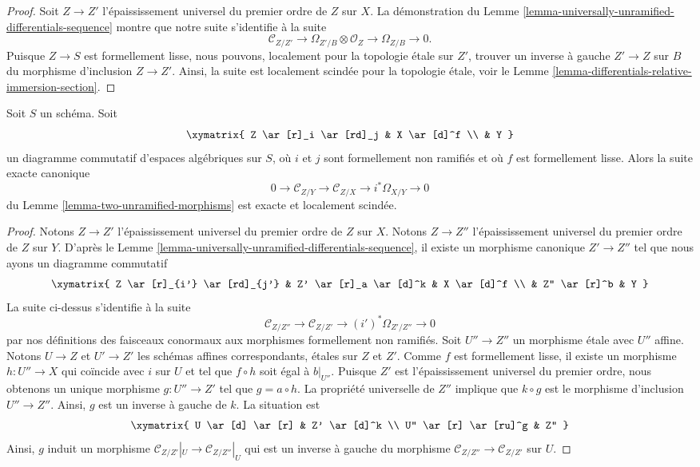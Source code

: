\begin{proof}
Soit $Z \to Z'$ l'épaississement universel du premier ordre de $Z$ sur $X$.
La démonstration du
Lemme \ref{lemma-universally-unramified-differentials-sequence}
montre que notre suite s'identifie à la suite
$$
\mathcal{C}_{Z/Z'} \to \Omega_{Z'/B} \otimes \mathcal{O}_Z \to
\Omega_{Z/B} \to 0.
$$
Puisque $Z \to S$ est formellement lisse, nous pouvons, localement pour la topologie étale sur $Z'$, trouver
un inverse à gauche $Z' \to Z$ sur $B$ du morphisme d'inclusion $Z \to Z'$.
Ainsi, la suite est localement scindée pour la topologie étale, voir le
Lemme \ref{lemma-differentials-relative-immersion-section}.
\end{proof}

\begin{lemma}
\label{lemma-two-unramified-morphisms-formally-smooth}
Soit $S$ un schéma. Soit
$$
\xymatrix{
Z \ar[r]_i \ar[rd]_j & X \ar[d]^f \\
& Y
}
$$
un diagramme commutatif d'espaces algébriques sur $S$,
où $i$ et $j$ sont formellement non ramifiés et où $f$ est formellement lisse.
Alors la suite exacte canonique
$$
0 \to
\mathcal{C}_{Z/Y} \to
\mathcal{C}_{Z/X} \to
i^*\Omega_{X/Y} \to 0
$$
du
Lemme \ref{lemma-two-unramified-morphisms}
est exacte et localement scindée.
\end{lemma}

\begin{proof}
Notons $Z \to Z'$ l'épaississement universel du premier ordre de $Z$ sur $X$.
Notons $Z \to Z''$ l'épaississement universel du premier ordre de $Z$ sur $Y$.
D'après le
Lemme \ref{lemma-universally-unramified-differentials-sequence},
il existe un morphisme canonique $Z' \to Z''$ tel que nous ayons un diagramme
commutatif
$$
\xymatrix{
Z \ar[r]_{i'} \ar[rd]_{j'} & Z' \ar[r]_a \ar[d]^k & X \ar[d]^f \\
& Z'' \ar[r]^b & Y
}
$$
La suite ci-dessus s'identifie à la suite
$$
\mathcal{C}_{Z/Z''} \to
\mathcal{C}_{Z/Z'} \to
(i')^*\Omega_{Z'/Z''} \to 0
$$
par nos définitions des faisceaux conormaux aux morphismes formellement non ramifiés.
Soit $U'' \to Z''$ un morphisme étale avec $U''$ affine.
Notons $U \to Z$ et $U' \to Z'$ les schémas affines correspondants,
étales sur $Z$ et $Z'$.
Comme $f$ est formellement lisse, il existe un morphisme $h : U'' \to X$
qui coïncide avec $i$ sur $U$ et tel que $f \circ h$ soit égal à $b|_{U''}$.
Puisque $Z'$ est l'épaississement universel du premier ordre, nous obtenons un unique
morphisme $g : U'' \to Z'$ tel que $g = a \circ h$. La propriété
universelle de $Z''$ implique que $k \circ g$ est le morphisme d'inclusion
$U'' \to Z''$. Ainsi, $g$ est un inverse à gauche de $k$. La situation est
$$
\xymatrix{
U \ar[d] \ar[r] & Z' \ar[d]^k \\
U'' \ar[r] \ar[ru]^g & Z''
}
$$
Ainsi, $g$ induit un morphisme $\mathcal{C}_{Z/Z'}|_U \to \mathcal{C}_{Z/Z''}|_U$
qui est un inverse à gauche du morphisme
$\mathcal{C}_{Z/Z''} \to \mathcal{C}_{Z/Z'}$ sur $U$.
\end{proof}











